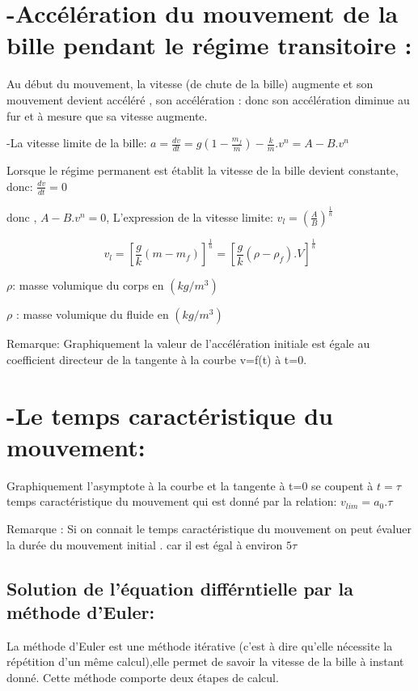 \documentclass[12pt]{article}
\begin{document}
\section*{-Accélération du mouvement de la bille pendant le régime transitoire :}
Au début du mouvement, la vitesse (de chute de la bille) augmente et son mouvement devient accéléré , son accélération
: donc son accélération diminue au fur et à mesure que sa vitesse augmente.

-La vitesse limite de la bille: $a = \frac{dv}{dt} = g(1 - \frac{m_f}{m}) - \frac{k}{m}.v^n = A- B.v^n$ 

Lorsque le régime permanent est établit la vitesse de la bille devient constante, donc: $\frac{dv}{dt} = 0$

donc , $A-B.v^n = 0$, L’expression de la vitesse limite: $v_l = (\frac{A}{B})^{\frac{1}{n}}$

$$v_l = [\frac{g}{k}(m - m_f)]^{\frac{1}{n}} = [\frac{g}{k}(\rho - \rho_f).V]^{\frac{1}{n}}$$

$\rho $: masse volumique du corps en $(kg/m^3)$

$\rho$ : masse volumique du fluide en $(kg/m^3)$

\begin{tcolorbox}

Remarque: Graphiquement la valeur de l'accélération initiale est égale au coefficient directeur de la tangente à la
courbe v=f(t) à t=0.
\end{tcolorbox}


\section*{-Le temps caractéristique du mouvement:}
Graphiquement l'asymptote à la courbe et la tangente à t=0 se coupent à $t = \tau$
temps caractéristique du mouvement qui est donné par la relation: $v_{lim} = a_0.\tau$

\begin{tcolorbox}
Remarque : Si on connait le temps caractéristique du mouvement on peut évaluer la durée du mouvement initial . car il est égal à environ $5\tau$
\end{tcolorbox}

\subsection{Solution de l'équation différntielle par la méthode d'Euler:}

La méthode d'Euler est une méthode itérative (c'est à dire qu'elle nécessite la répétition d'un même calcul),elle permet de
savoir la vitesse de la bille à instant donné.
Cette méthode comporte deux étapes de calcul.
\end{document}
